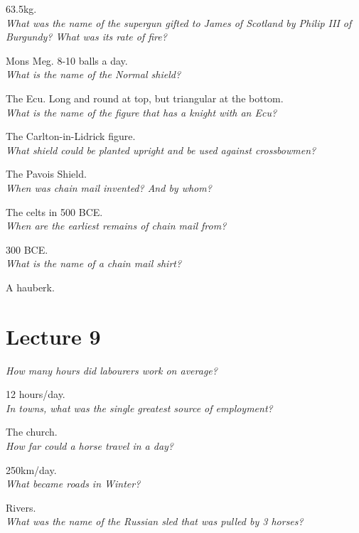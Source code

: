 \documentclass[12pt]{article}
\begin{document}
63.5kg.\\

\textit{What was the name of the supergun gifted to James of Scotland by Philip III of Burgundy? What was its rate of fire?}

Mons Meg. 8-10 balls a day.\\

\textit{What is the name of the Normal shield?}

The Ecu. Long and round at top, but triangular at the bottom.\\

\textit{What is the name of the figure that has a knight with an Ecu?}

The Carlton-in-Lidrick figure.\\

\textit{What shield could be planted upright and be used against crossbowmen?}

The Pavois Shield.\\

\textit{When was chain mail invented? And by whom?}

The celts in 500 BCE.\\

\textit{When are the earliest remains of chain mail from?}

300 BCE.\\

\textit{What is the name of a chain mail shirt?}

A hauberk.\\

\section*{Lecture 9}

\textit{How many hours did labourers work on average?}

12 hours/day.\\

\textit{In towns, what was the single greatest source of employment?}

The church.\\

\textit{How far could a horse travel in a day?}

250km/day.\\

\textit{What became roads in Winter?}

Rivers.\\

\textit{What was the name of the Russian sled that was pulled by 3 horses?}
\end{document}
